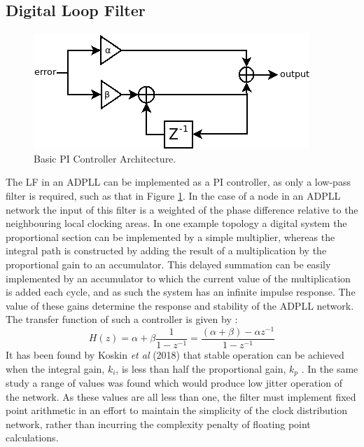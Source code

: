 \subsection{Digital Loop Filter}
\begin{figure}[h]
	\centering
	\includegraphics[scale=0.45]{../pi_simple}
	\caption{Basic PI Controller Architecture.}
	\label{fig:my_simple_pi}
\end{figure}%
The \acl{LF} in an \ac{ADPLL} can be implemented as a \ac{PI} controller, as only a low-pass filter is required, such as that in Figure \ref{fig:my_simple_pi}. In the case of a node in an \ac{ADPLL} network the input of this filter is a weighted of the phase difference relative to the neighbouring local clocking areas. In one example topology a digital system the proportional section can be implemented by a simple multiplier, whereas the integral path is constructed by adding the result of a multiplication by the proportional gain to an accumulator. This delayed summation can be easily implemented by an accumulator to which the current value of the multiplication is added each cycle, and as such the system has an infinite impulse response. The value of these gains determine the response and stability of the \ac{ADPLL} network. The transfer function of such a controller is given by \cite{shan2014phd}:
\begin{equation*}
	H(z) = \alpha + \beta\frac{1}{1-z^{-1}} = \frac{(\alpha + \beta) - \alpha z^{-1}}{1-z^{-1}}
\end{equation*}
It has been found by Koskin \textit{et al} (2018) that stable operation can be achieved when the integral gain, $k_i$, is less than half the proportional gain, $k_p$ \cite{koskin2018generation}. In the same study a range of values was found which would produce low jitter operation of the network. As these values are all less than one, the filter must implement fixed point arithmetic in an effort to maintain the simplicity of the clock distribution network, rather than incurring the complexity penalty of floating point calculations.

